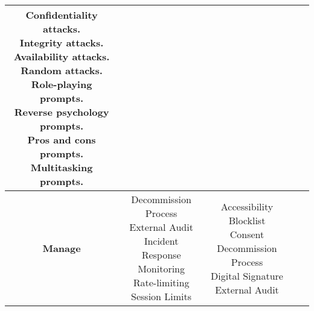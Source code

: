 \documentclass[fleqn]{article}
\begin{document}
\begin{landscape}
\begin{table}[H]
\begin{tabular}{|c|c|c|c|c|}
{			\textbullet\hspace{3pt} Confidentiality attacks.  \\ 
			\textbullet\hspace{3pt} Integrity attacks.  \\ 
			\textbullet\hspace{3pt} Availability attacks. \\ 
			\textbullet\hspace{3pt} Random attacks. \\ 
			\textbullet\hspace{3pt} Role-playing prompts. \\
			\textbullet\hspace{3pt} Reverse psychology prompts. \\
			\textbullet\hspace{3pt} Pros and cons prompts. \\
			\textbullet\hspace{3pt} Multitasking prompts. \\
		}
		\\
		\hline
		\textbf{Manage} & \makecell[l]{
			\textbullet\hspace{3pt} Decommission Process\\ 	
			\textbullet\hspace{3pt} External Audit\\ 
			\textbullet\hspace{3pt} Incident Response\\ 
			\textbullet\hspace{3pt} Monitoring\\
			\textbullet\hspace{3pt} Rate-limiting \\ 
			\textbullet\hspace{3pt} Session Limits\\						 	 
		}
		& \makecell[l]{
			\textbullet\hspace{3pt} Accessibility \\ 	
			\textbullet\hspace{3pt} Blocklist \\ 	
			\textbullet\hspace{3pt} Consent\\ 	
			\textbullet\hspace{3pt} Decommission Process\\ 	
			\textbullet\hspace{3pt} Digital Signature\\ 	
			\textbullet\hspace{3pt} External Audit\\ 
}
\end{tabular}
\end{table}
\end{landscape}
\end{document}
